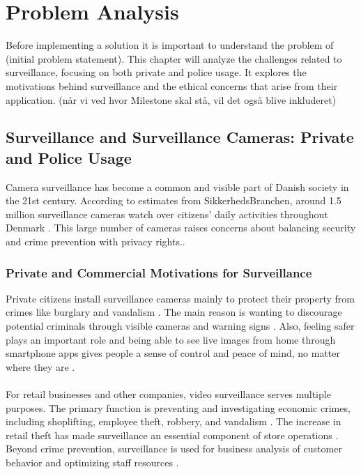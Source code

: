 \chapter{Problem Analysis}
\label{cha:problemanalysis}
Before implementing a solution it is important to understand the problem of (initial problem statement). This chapter will analyze the challenges related to surveillance, focusing on both private and police usage. It explores the motivations behind surveillance and the ethical concerns that arise from their application. (når vi ved hvor Milestone skal stå, vil det også blive inkluderet)

\section{Surveillance and Surveillance Cameras: Private and Police Usage}\label{sec:police}

Camera surveillance has become a common and visible part of Danish society in the 21st century. According to estimates from SikkerhedsBranchen, around 1.5 million surveillance cameras watch over citizens' daily activities throughout Denmark \cite{overvagningsekspert2025}. This large number of cameras raises concerns about balancing security and crime prevention with privacy rights.\cite{videnskab2024}.

\subsection{Private and Commercial Motivations for Surveillance}

Private citizens install surveillance cameras mainly to protect their property from crimes like burglary and vandalism \cite{bolius2024}. The main reason is wanting to discourage potential criminals through visible cameras and warning signs \cite{bolius2024}. Also, feeling safer plays an important role and being able to see live images from home through smartphone apps gives people a sense of control and peace of mind, no matter where they are \cite{bolius2024}.
\\\\
For retail businesses and other companies, video surveillance serves multiple purposes. The primary function is preventing and investigating economic crimes, including shoplifting, employee theft, robbery, and vandalism \cite{bolius2024}. The increase in retail theft has made surveillance an essential component of store operations \cite{retailnews2025,danskerhverv2025rapport,securityuser2025}. Beyond crime prevention, surveillance is used for business analysis of customer behavior and optimizing staff resources \cite{securitas2024butik}.


